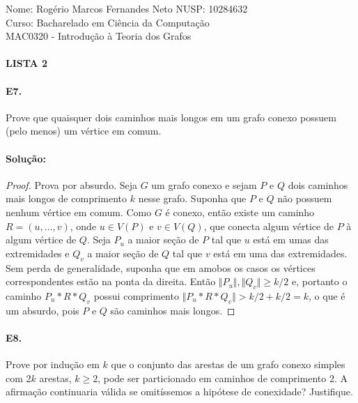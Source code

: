 \documentclass[11pt,a4paper,notitlepage]{exam}
\begin{document}
\begin{center}
  Nome: Rogério Marcos Fernandes Neto\hphantom{xxx} NUSP: 10284632\\
  Curso: Bacharelado em Ciência da Computação\\
  MAC0320 - Introdução à Teoria dos Grafos
  \paragraph{}
  \textbf{LISTA 2}
\end{center}
\paragraph{E7.} Prove que quaisquer dois caminhos mais longos em um grafo conexo possuem (pelo menos)
um vértice em comum.
\paragraph*{Solução:}
\begin{proof}
  Prova por absurdo. Seja $G$ um grafo conexo e sejam $P$ e $Q$ dois caminhos mais longos de comprimento $k$ nesse grafo. Suponha que $P$ e $Q$ não possuem nenhum vértice em comum.
  Como $G$ é conexo, então existe um caminho $R = (u,\dots, v)$, onde $u \in V(P)$ e $v \in V(Q)$, que conecta algum vértice de $P$ à algum vértice de $Q$. Seja $P_u$ a maior seção de $P$ tal que $u$ está em umas das extremidades e $Q_v$ a maior seção de $Q$ tal que $v$ está em uma das extremidades. Sem perda de generalidade, suponha que em amobos os casos os vértices correspondentes estão na ponta da direita. Então $\Vert P_u\Vert, \Vert Q_v\Vert \geq k/2$ e, portanto o caminho $P_u*R*Q_v$ possui comprimento $\Vert P_u*R*Q_v\Vert > k/2 + k/2 = k$, o que é um absurdo, pois $P$ e $Q$ são caminhos mais longos.
\end{proof}

\paragraph{E8.} Prove por indução em $k$ que o conjunto das arestas de um grafo conexo simples com $2k$ arestas,
$k \geq 2$, pode ser particionado em caminhos de comprimento $2$. A afirmação continuaria válida
se omitíssemos a hipótese de conexidade? Justifique.
\end{document}
